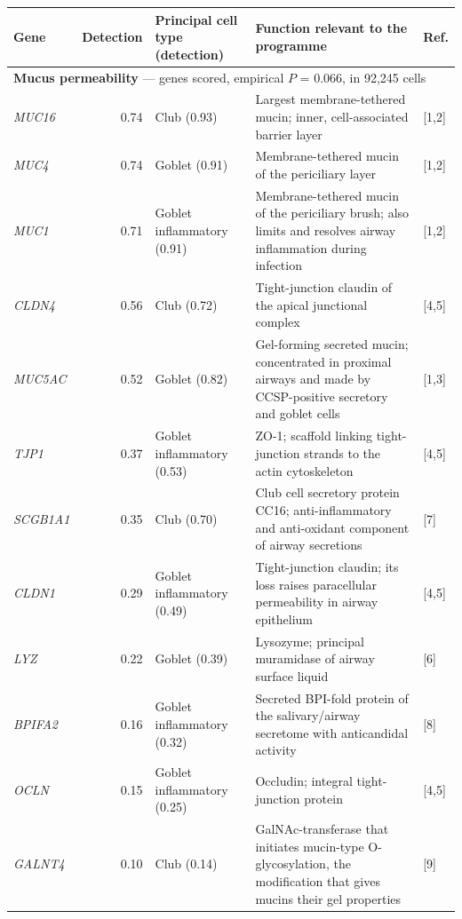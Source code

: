 \documentclass[10pt]{article}
\begin{document}
\vspace{8pt}
{\footnotesize
\begin{longtable}{@{}l r l p{85mm} l@{}}
\toprule
\textbf{Gene} & \textbf{Detection} & \textbf{Principal cell type (detection)} &
\textbf{Function relevant to the programme} & \textbf{Ref.} \\
\midrule
\endhead
\multicolumn{5}{l}{\textbf{Mucus permeability} \;---\; 13 genes scored, empirical $P$ = 0.066, in 92,245 cells} \\[1pt]
\midrule
\textit{MUC16} & 0.74 & Club (0.93) & Largest membrane-tethered mucin; inner, cell-associated barrier layer & [1,2] \\
\textit{MUC4} & 0.74 & Goblet (0.91) & Membrane-tethered mucin of the periciliary layer & [1,2] \\
\textit{MUC1} & 0.71 & Goblet inflammatory (0.91) & Membrane-tethered mucin of the periciliary brush; also limits and resolves airway inflammation during infection & [1,2] \\
\textit{CLDN4} & 0.56 & Club (0.72) & Tight-junction claudin of the apical junctional complex & [4,5] \\
\textit{MUC5AC} & 0.52 & Goblet (0.82) & Gel-forming secreted mucin; concentrated in proximal airways and made by CCSP-positive secretory and goblet cells & [1,3] \\
\textit{TJP1} & 0.37 & Goblet inflammatory (0.53) & ZO-1; scaffold linking tight-junction strands to the actin cytoskeleton & [4,5] \\
\textit{SCGB1A1} & 0.35 & Club (0.70) & Club cell secretory protein CC16; anti-inflammatory and anti-oxidant component of airway secretions & [7] \\
\textit{CLDN1} & 0.29 & Goblet inflammatory (0.49) & Tight-junction claudin; its loss raises paracellular permeability in airway epithelium & [4,5] \\
\textit{LYZ} & 0.22 & Goblet (0.39) & Lysozyme; principal muramidase of airway surface liquid & [6] \\
\textit{BPIFA2} & 0.16 & Goblet inflammatory (0.32) & Secreted BPI-fold protein of the salivary/airway secretome with anticandidal activity & [8] \\
\textit{OCLN} & 0.15 & Goblet inflammatory (0.25) & Occludin; integral tight-junction protein & [4,5] \\
\textit{GALNT4} & 0.10 & Club (0.14) & GalNAc-transferase that initiates mucin-type O-glycosylation, the modification that gives mucins their gel properties & [9] \\

\end{longtable}}
\end{document}
